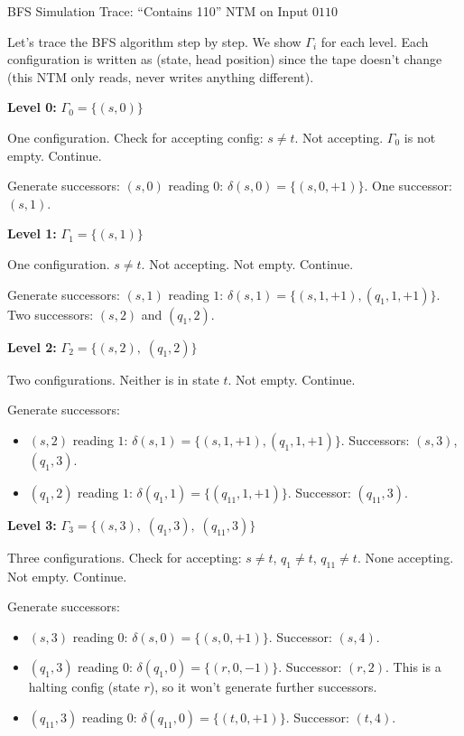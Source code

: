 \begin{examplebox}{BFS Simulation Trace: ``Contains 110'' NTM on Input $0110$}

Let's trace the BFS algorithm step by step. We show $\Gamma_i$ for each level.
Each configuration is written as (state, head position) since the tape doesn't
change (this NTM only reads, never writes anything different).

\textbf{Level 0:} $\Gamma_0 = \{(s, 0)\}$

One configuration. Check for accepting config: $s \neq t$. Not accepting.
$\Gamma_0$ is not empty. Continue.

Generate successors: $(s, 0)$ reading $0$: $\delta(s, 0) = \{(s, 0, +1)\}$.
One successor: $(s, 1)$.

\textbf{Level 1:} $\Gamma_1 = \{(s, 1)\}$

One configuration. $s \neq t$. Not accepting. Not empty. Continue.

Generate successors: $(s, 1)$ reading $1$:
$\delta(s, 1) = \{(s, 1, +1), (q_1, 1, +1)\}$. Two successors: $(s, 2)$ and
$(q_1, 2)$.

\textbf{Level 2:} $\Gamma_2 = \{(s, 2),\; (q_1, 2)\}$

Two configurations. Neither is in state $t$. Not empty. Continue.

Generate successors:
\begin{itemize}[nosep]
\item $(s, 2)$ reading $1$: $\delta(s, 1) = \{(s, 1, +1), (q_1, 1, +1)\}$.
  Successors: $(s, 3)$, $(q_1, 3)$.
\item $(q_1, 2)$ reading $1$: $\delta(q_1, 1) = \{(q_{11}, 1, +1)\}$.
  Successor: $(q_{11}, 3)$.
\end{itemize}

\textbf{Level 3:} $\Gamma_3 = \{(s, 3),\; (q_1, 3),\; (q_{11}, 3)\}$

Three configurations. Check for accepting: $s \neq t$, $q_1 \neq t$,
$q_{11} \neq t$. None accepting. Not empty. Continue.

Generate successors:
\begin{itemize}[nosep]
\item $(s, 3)$ reading $0$: $\delta(s, 0) = \{(s, 0, +1)\}$. Successor:
  $(s, 4)$.
\item $(q_1, 3)$ reading $0$: $\delta(q_1, 0) = \{(r, 0, -1)\}$. Successor:
  $(r, 2)$. This is a halting config (state $r$), so it won't generate
  further successors.
\item $(q_{11}, 3)$ reading $0$: $\delta(q_{11}, 0) = \{(t, 0, +1)\}$.
  Successor: $(t, 4)$.
\end{itemize}


\end{examplebox}
